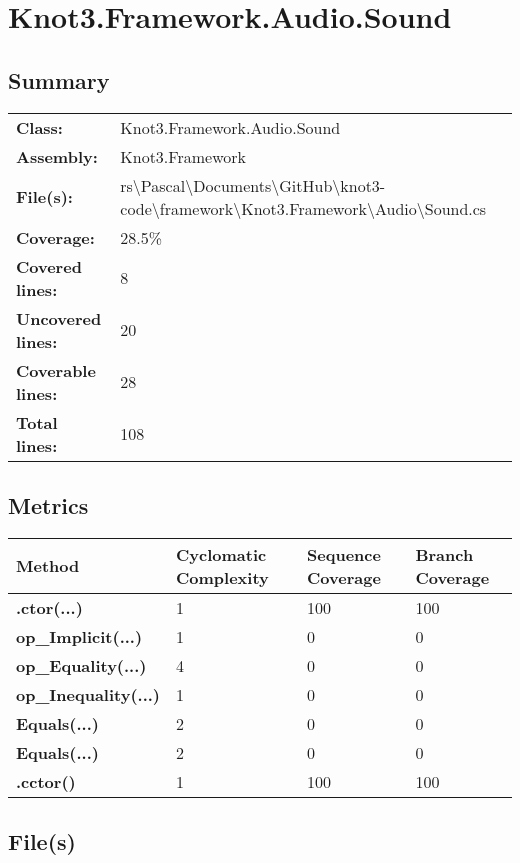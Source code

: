 \documentclass[a4paper,10pt]{article}
\begin{document}
\section{Knot3.Framework.Audio.Sound}
\subsection{Summary}
\begin{longtable}[l]{ll}
\textbf{Class:} & Knot3.Framework.Audio.Sound\\
\textbf{Assembly:} & Knot3.Framework\\
\textbf{File(s):} & \begin{minipage}[t]{12cm}{rs\textbackslash Pascal\textbackslash Documents\textbackslash GitHub\textbackslash knot3-code\textbackslash framework\textbackslash Knot3.Framework\textbackslash Audio\textbackslash Sound.cs}\end{minipage} \\
\textbf{Coverage:} & 28.5\%\\
\textbf{Covered lines:} & 8\\
\textbf{Uncovered lines:} & 20\\
\textbf{Coverable lines:} & 28\\
\textbf{Total lines:} & 108\\
\end{longtable}
\subsection{Metrics}
\begin{longtable}[l]{|l|l|l|l|}
\hline
\textbf{Method} & \textbf{Cyclomatic Complexity} & \textbf{Sequence Coverage} & \textbf{Branch Coverage}\\
\hline
\textbf{.ctor(...)} & 1 & 100 & 100\\
\hline
\textbf{op\_Implicit(...)} & 1 & 0 & 0\\
\hline
\textbf{op\_Equality(...)} & 4 & 0 & 0\\
\hline
\textbf{op\_Inequality(...)} & 1 & 0 & 0\\
\hline
\textbf{Equals(...)} & 2 & 0 & 0\\
\hline
\textbf{Equals(...)} & 2 & 0 & 0\\
\hline
\textbf{.cctor()} & 1 & 100 & 100\\
\hline
\end{longtable}
\subsection{File(s)}
\end{document}
